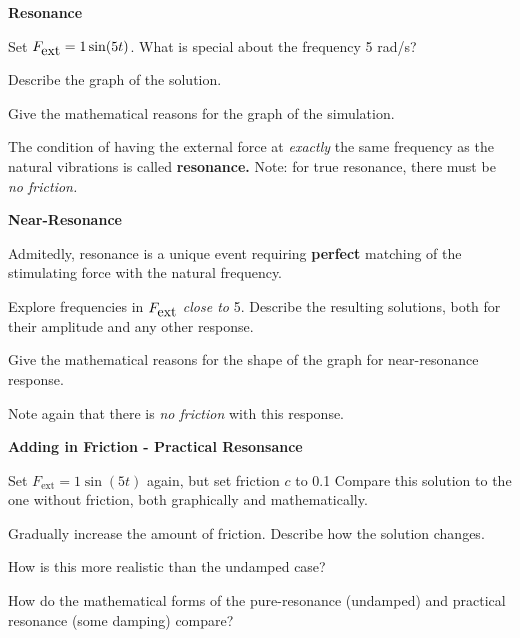 
{\bf Resonance}

Set $F_{\mbox{ext}} = 1 \sin(5t)$.  What is special about the
  frequency 5 rad/s?

\vfill

Describe the graph of the solution.

\vfill

Give the mathematical reasons for the graph of the
  simulation.\\

\vfill

The condition of having the external force at {\em exactly} the same
frequency as the natural vibrations is called {\bf resonance.}  Note:
for true resonance, there must be {\em no friction.}

\newpage

{\bf Near-Resonance}

Admitedly, resonance is a unique event requiring {\bf perfect}
matching of the stimulating force with the natural frequency.

Explore frequencies in $F_{\mbox{ext}}$ {\em close to} 5.  Describe
  the resulting solutions, both for their amplitude and any other
  response.

\vfill

Give the mathematical reasons for the shape of the graph
  for near-resonance response.

\vfill

Note again that there is {\em no friction} with this response.

\newpage


{\bf Adding in Friction - Practical Resonsance}

Set $F_{\mbox{ext}} = 1 \sin(5t)$ again, but set friction $c$ to 0.1 Compare this
solution to the one without friction, both graphically and
mathematically.

\vfill

Gradually increase the amount of friction.  Describe how the solution
changes.

\vfill

How is this more realistic than the undamped case?

\vfill

How do the mathematical forms of the pure-resonance (undamped) and
practical resonance (some damping) compare?

\vfill

